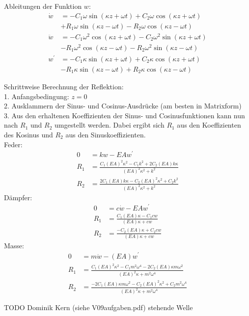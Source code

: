 \begin{solution}
        Ableitungen der Funktion $w$:
        \begin{align*}
            \dot{w} &= -C_1 \omega \sin(\kappa z + \omega t) + C_2 \omega \cos(\kappa z + \omega t) \\
                     &+ R_1 \omega \sin(\kappa z - \omega t) - R_2 \omega \cos(\kappa z - \omega t) \\
            \ddot{w} &= - C_1 \omega^2 \cos(\kappa z + \omega t) - C_2 \omega^2 \sin(\kappa z + \omega t) \\
                     &-R_1 \omega^2 \cos(\kappa z - \omega t) - R_2 \omega^2 \sin(\kappa z - \omega t) \\
            w^{'} &= -C_1 \kappa \sin(\kappa z + \omega t) + C_2 \kappa \cos(\kappa z + \omega t) \\
                   &-R_1 \kappa \sin(\kappa z - \omega t) + R_2 \kappa \cos(\kappa z - \omega t)
        \end{align*}

        Schrittweise Berechnung der Reflektion: \\
        1. Anfangsbedingung: $z=0$ \\
        2. Ausklammern der Sinus- und Cosinus-Ausdrücke (am besten in Matrixform)\\
        3. Aus den erhaltenen Koeffizienten der Sinus- und Cosinusfunktionen kann nun nach $R_1$ und $R_2$ umgestellt werden.
            Dabei ergibt sich $R_1$ aus den Koeffizienten des Kosinus und $R_2$ aus den Sinuskoeffizienten.\\

        Feder:
        \begin{align*}
            0 &= kw - EA  w^{'}\\
            R_1 &= \frac{C_1 {(EA)}^2 \kappa^2 - C_1 k^2 + 2C_2 (EA) k \kappa}{{(EA)}^2 \kappa^2 + k^2}\\
            R_2 &= \frac{2C_1 (EA) k \kappa - C_2 {(EA)}^2 \kappa^2 + C_2 k^2}{{(EA)}^2 \kappa^2 + k^2}
        \end{align*}
        Dämpfer:
        \begin{align*}
            0 &= c \dot{w} - EA  w^{'}\\
            R_1 &= \frac{C_1 (EA) \kappa - C_1 c w}{(EA) \kappa + cw}\\
            R_2 &= \frac{-C_2 (EA) \kappa + C_2 cw}{(EA) \kappa + cw}
        \end{align*}
        Masse:
        \begin{align*}
            0 &= m \ddot{w} - (EA) w^{'}\\
            R_1 &= \frac{C_1 {(EA)}^2 \kappa^2 - C_1 m^2 \omega^4 - 2C_2 (EA) \kappa m \omega^2}{{(EA)}^2 \kappa + m^2 \omega^4}\\
            R_2 &= \frac{-2C_1 (EA) \kappa m \omega^2 - C_2 {(EA)}^2 \kappa^2 + C_2 m^2 \omega^4}{{(EA)}^2 \kappa + m^2 \omega^4}
    \end{align*}
\end{solution}

TODO Dominik Kern (siehe V09aufgaben.pdf) stehende Welle

\vspace{1cm}


